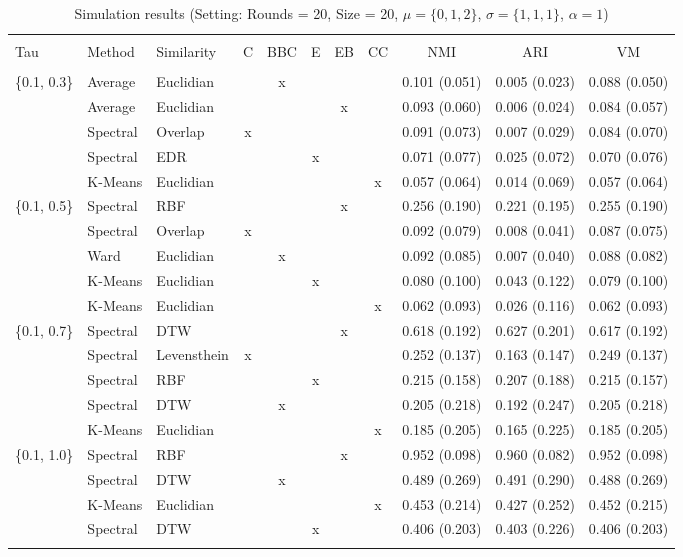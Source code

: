 \documentclass[12pt,a4paper,bibliography=totocnumbered,listof=totocnumbered]{scrartcl}
\begin{document}
\begin{appendix}
\begin{table}[!htbp] \centering 
	\label{} 
	\scriptsize
	\begin{tabularx}{\textwidth}{ lllcccccccc} \\
		\\[-1.8ex]	\toprule
		\\[-1.8ex] 
		Tau & Method & Similarity & C & BBC & E & EB & CC & NMI & ARI & VM \\ 
		\hline \\[-1.8ex] 
\{0.1, 0.3\} & Average & Euclidian &  & x &  &  &  & 0.101 (0.051) & 0.005 (0.023) & 0.088 (0.050) \\ 
& Average & Euclidian &  &  &  & x &  & 0.093 (0.060) & 0.006 (0.024) & 0.084 (0.057) \\ 
& Spectral & Overlap & x &  &  &  &  & 0.091 (0.073) & 0.007 (0.029) & 0.084 (0.070) \\ 
& Spectral & EDR &  &  & x &  &  & 0.071 (0.077) & 0.025 (0.072) & 0.070 (0.076) \\ 
& K-Means & Euclidian &  &  &  &  & x & 0.057 (0.064) & 0.014 (0.069) & 0.057 (0.064) \\ 
\{0.1, 0.5\} & Spectral & RBF &  &  &  & x &  & 0.256 (0.190) & 0.221 (0.195) & 0.255 (0.190) \\ 
& Spectral & Overlap & x &  &  &  &  & 0.092 (0.079) & 0.008 (0.041) & 0.087 (0.075) \\ 
& Ward & Euclidian &  & x &  &  &  & 0.092 (0.085) & 0.007 (0.040) & 0.088 (0.082) \\ 
& K-Means & Euclidian &  &  & x &  &  & 0.080 (0.100) & 0.043 (0.122) & 0.079 (0.100) \\ 
& K-Means & Euclidian &  &  &  &  & x & 0.062 (0.093) & 0.026 (0.116) & 0.062 (0.093) \\ 
\{0.1, 0.7\} & Spectral & DTW &  &  &  & x &  & 0.618 (0.192) & 0.627 (0.201) & 0.617 (0.192) \\ 
& Spectral & Levensthein & x &  &  &  &  & 0.252 (0.137) & 0.163 (0.147) & 0.249 (0.137) \\ 
& Spectral & RBF &  &  & x &  &  & 0.215 (0.158) & 0.207 (0.188) & 0.215 (0.157) \\ 
& Spectral & DTW &  & x &  &  &  & 0.205 (0.218) & 0.192 (0.247) & 0.205 (0.218) \\ 
& K-Means & Euclidian &  &  &  &  & x & 0.185 (0.205) & 0.165 (0.225) & 0.185 (0.205) \\ 
\{0.1, 1.0\} & Spectral & RBF &  &  &  & x &  & 0.952 (0.098) & 0.960 (0.082) & 0.952 (0.098) \\ 
& Spectral & DTW &  & x &  &  &  & 0.489 (0.269) & 0.491 (0.290) & 0.488 (0.269) \\ 
& K-Means & Euclidian &  &  &  &  & x & 0.453 (0.214) & 0.427 (0.252) & 0.452 (0.215) \\ 
& Spectral & DTW &  &  & x &  &  & 0.406 (0.203) & 0.403 (0.226) & 0.406 (0.203) \\ 
		\hline \\[-1.8ex] 
	\end{tabularx} 
		\caption{Simulation results (Setting: Rounds = 20, Size = 20, $\mu = \{0,1,2\}$, $\sigma =  \{1,1,1\}$, $\alpha = 1$)} 
\end{table} 


\end{appendix}
\end{document}
